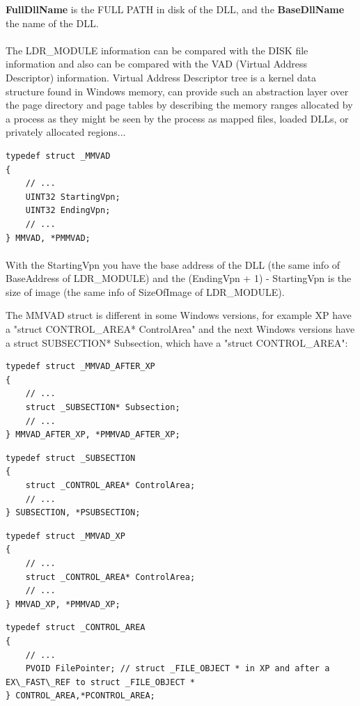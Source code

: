 \documentclass[12pt,a4paper,english]{book}
\newcommand{\ocite}[1]{\footfullcite{#1}}
\newcommand{\paraph}{\paragraph{}}
\begin{document}
{\bf FullDllName} is the FULL PATH in disk of the DLL, and the {\bf BaseDllName} the name of the DLL.

\paraph{}
The LDR\_MODULE information can be compared with the DISK file information and also can be compared with the VAD (Virtual Address Descriptor) information. Virtual Address Descriptor tree is a kernel data structure found in Windows memory, can provide such an abstraction layer over the page directory and page tables by describing the memory ranges allocated by a process as they might be seen by the process as mapped files, loaded DLLs, or privately allocated regions... \ocite{brendogavad2007}

\lstset{language=C,caption=MMVAD data useful for the detection}
\begin{lstlisting}
typedef struct _MMVAD
{
    // ...
    UINT32 StartingVpn;
    UINT32 EndingVpn;
    // ...
} MMVAD, *PMMVAD;
\end{lstlisting}

\paraph{}
With the StartingVpn you have the base address of the DLL (the same info of BaseAddress of LDR\_MODULE) and the (EndingVpn + 1) - StartingVpn is the size of image (the same info of SizeOfImage of LDR\_MODULE).

The MMVAD struct is different in some Windows versions, for example XP have a "struct CONTROL\_AREA* ControlArea" and the next Windows versions have a struct SUBSECTION* Subsection, which have a "struct CONTROL\_AREA":

\lstset{language=C,caption=MMVAD data after XP have a pointer to SubSection}
\begin{lstlisting}
typedef struct _MMVAD_AFTER_XP
{
    // ...
    struct _SUBSECTION* Subsection;
    // ...
} MMVAD_AFTER_XP, *PMMVAD_AFTER_XP;
\end{lstlisting}


\lstset{language=C,caption=SUBSECTION structure}
\begin{lstlisting}
typedef struct _SUBSECTION
{
    struct _CONTROL_AREA* ControlArea;
    // ...
} SUBSECTION, *PSUBSECTION;
\end{lstlisting}

\lstset{language=C,caption=MMVAD data in XP have a pointer to ControlArea}
\begin{lstlisting}
typedef struct _MMVAD_XP
{
    // ...
    struct _CONTROL_AREA* ControlArea;
    // ...
} MMVAD_XP, *PMMVAD_XP;
\end{lstlisting}

\lstset{language=C,caption=ControlArea struct}
\begin{lstlisting}
typedef struct _CONTROL_AREA
{
    // ...
    PVOID FilePointer; // struct _FILE_OBJECT * in XP and after a EX\_FAST\_REF to struct _FILE_OBJECT *
} CONTROL_AREA,*PCONTROL_AREA;
\end{lstlisting}
\end{document}
